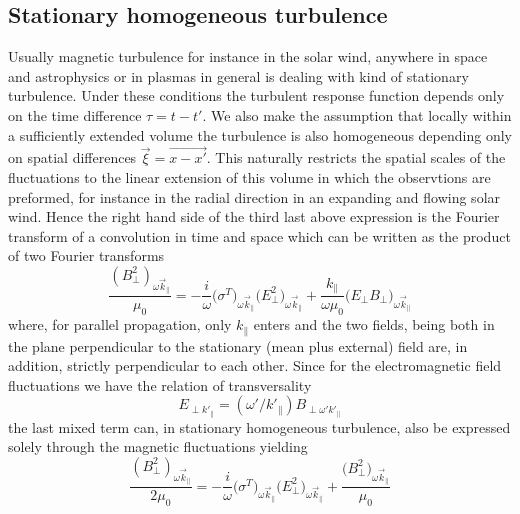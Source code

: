 \documentclass[ ]{copernicus2}
\begin{document}
{\subsection{{Stationary homogeneous turbulence}}
Usually magnetic turbulence for instance in the solar wind, anywhere in space and astrophysics or in plasmas in general is dealing with kind of stationary turbulence. Under these conditions the turbulent response function depends only on the time difference $\tau=t-t'$. We also make the assumption that locally within a sufficiently extended volume the turbulence is also homogeneous depending only on spatial differences $\vec{\xi}=\vec{x-x'}$. This naturally restricts the spatial scales of the fluctuations to the linear extension of this volume in which the observtions are preformed, for instance in the radial direction in an expanding and flowing solar wind. Hence the right hand side of the third last above expression is the Fourier transform of a convolution in time and space which can be written as the product of two Fourier transforms
\begin{equation}
\frac{(B_\perp^2)_{\omega\vec{k}_\|}}{\mu_0} = -\frac{i}{\omega}\big(\sigma^T\big)_{\omega\vec{k}_\|}\big(E_\perp^2\big)_{\omega\vec{k}_\|}+\frac{k_\|}{\omega\mu_0}\big({E_\perp B_\perp}\big)_{\omega\vec{k}_\|}
\end{equation}
where, for parallel propagation, only $k_\|$ enters and the two fields, being both in the plane perpendicular to the stationary (mean plus external) field are, in addition, strictly perpendicular to each other. Since for the electromagnetic field fluctuations we have the relation of transversality 
\begin{equation}
E_{\perp k'_\|}=(\omega'/k'_\|)B_{\perp \omega'k'_\|}
\end{equation}
the last mixed term can, in stationary homogeneous turbulence, also be expressed solely through the magnetic fluctuations yielding
\begin{equation}
\frac{(B_\perp^2)_{\omega\vec{k}_\|}}{2\mu_0} = -\frac{i}{\omega}\big(\sigma^T\big)_{\omega\vec{k}_\|}\big(E_\perp^2\big)_{\omega\vec{k}_\|}+\frac{\big(B_\perp^2\big)_{\omega\vec{k}_\|}}{\mu_0}
\end{equation}
 

}
\end{document}
